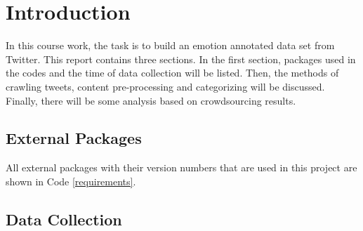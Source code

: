 \section{Introduction}

\renewcommand{\lstlistingname}{Code}

In this course work, the task is to build an emotion	annotated data set from Twitter. This report contains three sections. In the first section, packages used in the codes and the time of data collection will be listed. Then, the methods of crawling tweets, content pre-processing and categorizing will be discussed. Finally, there will be some analysis based on crowdsourcing results.

\subsection{External Packages}



All external packages with their version numbers that are used in this project are shown in Code \ref{requirements}.

\subsection{Data Collection}

